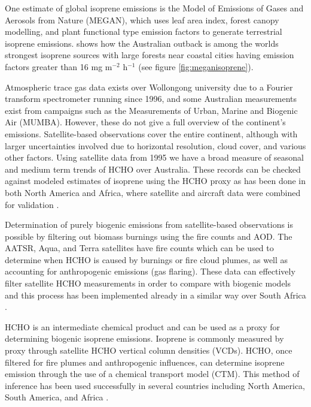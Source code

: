 One estimate of global isoprene emissions is the Model of Emissions of Gases and Aerosols from Nature (MEGAN), which uses leaf area index, forest canopy modelling, and plant functional type emission factors to generate terrestrial isoprene emissions.
\citet{Guenther_2006} shows how the Australian outback is among the worlds strongest isoprene sources with large forests near coastal cities having emission factors greater than 16 mg m$^{-2}$ h$^{-1}$ (see figure \ref{fig:meganisoprene}).

Atmospheric trace gas data exists over Wollongong university due to a Fourier transform spectrometer running since 1996, and some Australian measurements exist from campaigns such as the Measurements of Urban, Marine and Biogenic Air (MUMBA).
However, these do not give a full overview of the continent's emissions. 
Satellite-based observations cover the entire continent, although with larger uncertainties involved due to horizontal resolution, cloud cover, and various other factors. 
Using satellite data from 1995 we have a broad measure of seasonal and medium term trends of HCHO over Australia.
These records can be checked against modeled estimates of isoprene using the HCHO proxy as has been done in both North America and Africa, where satellite and aircraft data were combined for validation \cite{Millet_2006, Marais_2014}.

Determination of purely biogenic emissions from satellite-based observations is possible by filtering out biomass burnings using the fire counts and AOD.
The AATSR, Aqua, and Terra satellites have fire counts which can be used to determine when HCHO is caused by burnings or fire cloud plumes, as well as accounting for anthropogenic emissions (gas flaring).
These data can effectively filter satellite HCHO measurements in order to compare with biogenic models and this process has been implemented already in a similar way over South Africa \cite{Marais_2012}.

HCHO is an intermediate chemical product and can be used as a proxy for determining biogenic isoprene emissions. 
Isoprene is commonly measured by proxy through satellite HCHO vertical column densities (VCDs). HCHO, once filtered for fire plumes and anthropogenic influences, can determine isoprene emission through the use of a chemical transport model (CTM).
This method of inference has been used successfully in several countries including North America\cite{Palmer_2003}, South America\cite{Barkley_2013}, and Africa \cite{Marais_2012}.

